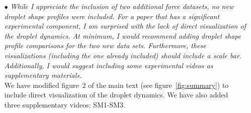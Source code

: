 \documentclass[]{article}
\begin{document}
\begin{enumerate}
	\item[$\bullet$] \textit{While I appreciate the inclusion of two additional force datasets, no new droplet shape profiles were included. For a paper that has a significant experimental component, I am surprised with the lack of direct visualization of the droplet dynamics. At minimum, I would recommend adding droplet shape profile comparisons for the two new data sets. Furthermore, these visualizations (including the one already included) should include a scale bar. Additionally, I would suggest including some experimental videos as supplementary materials.}\\[1mm]
	
	We have modified figure~2 of the main text (see figure~\ref{fig:summary}) to include direct visualization of the droplet dynamics. We have also added three supplementary videos: SM1-SM3. 
	

\end{enumerate}
\end{document}
